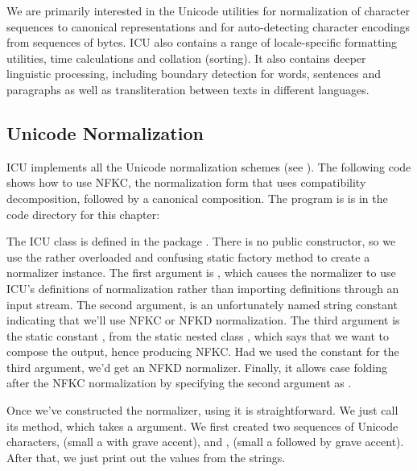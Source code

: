 We are primarily interested in the Unicode utilities for normalization
of character sequences to canonical representations and for
auto-detecting character encodings from sequences of bytes.  ICU also
contains a range of locale-specific formatting utilities, time
calculations and collation (sorting).  It also contains deeper
linguistic processing, including boundary detection for words,
sentences and paragraphs as well as transliteration between texts in
different languages.

\subsection{Unicode Normalization}\label{section:icu-unicode-normalization}

ICU implements all the Unicode normalization schemes (see
).  The following code shows how to use NFKC,
the normalization form that uses compatibility decomposition, followed
by a canonical composition.
The program is is in the code directory for this chapter:
%

%
%
The ICU class  is defined in the package
.  There is no public constructor, so we use the
rather overloaded and confusing static factory method
 to create a normalizer instance.  The first
argument is , which causes the normalizer to use ICU's
definitions of normalization rather than importing definitions through
an input stream.  The second argument,  is an
unfortunately named string constant indicating that we'll use NFKC or
NFKD normalization.  The third argument is the static constant
, from the static nested class ,
which says that we want to compose the output, hence producing NFKC.
Had we used the constant  for the third argument, we'd
get an NFKD normalizer.  Finally, it allows case folding after the NFKC normalization
by specifying the second argument as .  

Once we've constructed the normalizer, using it is straightforward.
We just call its  method, which takes a
 argument.  We first created two sequences of Unicode
characters,  (small a with grave accent), and
,  (small a followed by grave accent).
After that, we just print out the  values from the
strings.


